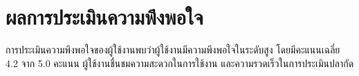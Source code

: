 \section*{ผลการประเมินความพึงพอใจ}

\indent การประเมินความพึงพอใจของผู้ใช้งานพบว่าผู้ใช้งานมีความพึงพอใจในระดับสูง
โดยมีคะแนนเฉลี่ย 4.2 จาก 5.0 คะแนน ผู้ใช้งานชื่นชมความสะดวกในการใช้งาน
และความรวดเร็วในการประเมินปลากัด

\par\endgroup
\clearpage

